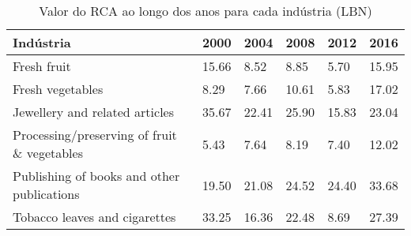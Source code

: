 \begin{table}
\centering
\caption{Valor do RCA ao longo dos anos para cada indústria (LBN)}
\label{tab:ex3-tempo-LBN}
\begin{tabular}{p{6cm}p{1.5cm}p{1.5cm}p{1.5cm}p{1.5cm}p{1.5cm}}
\toprule
                                  Indústria &  2000 &  2004 &  2008 &  2012 &  2016 \\
\midrule
                                Fresh fruit & 15.66 &  8.52 &  8.85 &  5.70 & 15.95 \\
                           Fresh vegetables &  8.29 &  7.66 & 10.61 &  5.83 & 17.02 \\
             Jewellery and related articles & 35.67 & 22.41 & 25.90 & 15.83 & 23.04 \\
Processing/preserving of fruit \& vegetables &  5.43 &  7.64 &  8.19 &  7.40 & 12.02 \\
 Publishing of books and other publications & 19.50 & 21.08 & 24.52 & 24.40 & 33.68 \\
              Tobacco leaves and cigarettes & 33.25 & 16.36 & 22.48 &  8.69 & 27.39 \\
\bottomrule
\end{tabular}
\end{table}
